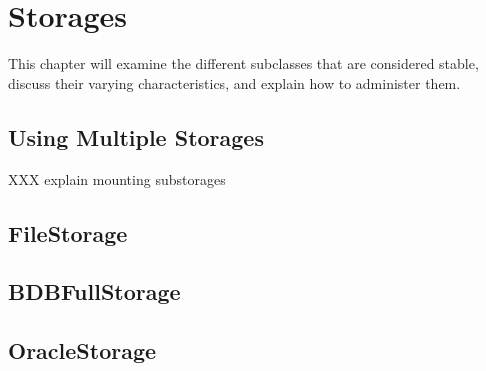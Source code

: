 

\section{Storages}

This chapter will examine the different  subclasses
that are considered stable, discuss their varying characteristics, and
explain how to administer them.

\subsection{Using Multiple Storages}

XXX explain mounting substorages

\subsection{FileStorage}

\subsection{BDBFullStorage}

\subsection{OracleStorage}

